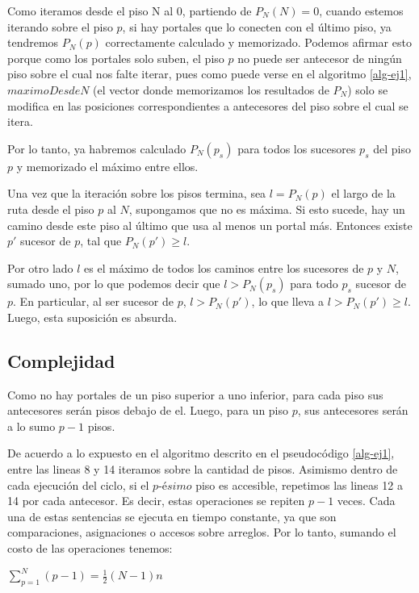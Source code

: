 Como iteramos desde el piso N al 0, partiendo de $P_N(N) = 0$, cuando estemos iterando sobre el piso $p$, si hay portales que lo conecten con el último piso, ya tendremos $P_N(p)$ correctamente calculado y memorizado.
Podemos afirmar esto porque como los portales solo suben, el piso $p$ no puede ser antecesor de ningún piso sobre el cual nos falte iterar, pues como puede verse en el algoritmo \ref{alg-ej1}, $maximoDesdeN$ (el vector donde memorizamos los resultados de $P_N$) solo se modifica en las posiciones correspondientes a antecesores del piso sobre el cual se itera.

Por lo tanto, ya habremos calculado $P_N(p_s)$ para todos los sucesores $p_s$ del piso $p$ y memorizado el máximo entre ellos. 

Una vez que la iteración sobre los pisos termina, sea $l = P_N(p)$ el largo de la ruta desde el piso $p$ al $N$, supongamos que no es máxima.
Si esto sucede, hay un camino desde este piso al último que usa al menos un portal más.  Entonces existe $p'$ sucesor de $p$, tal que $P_N(p') \geq l$. 

Por otro lado $l$ es el máximo de todos los caminos entre los sucesores de $p$ y $N$, sumado uno, por lo que podemos decir que $l > P_N(p_s)$ para todo $p_s$ sucesor de $p$.
En particular, al ser sucesor de $p$, $l > P_N(p')$, lo que lleva a $l > P_N(p') \geq l$. Luego, esta suposición es absurda.

\subsection{Complejidad}

Como no hay portales de un piso superior a uno inferior, para cada piso sus antecesores serán pisos debajo de el. Luego, para un piso $p$, sus antecesores serán a lo sumo $p-1$ pisos.

De acuerdo a lo expuesto en el algoritmo descrito en el pseudocódigo \ref{alg-ej1}, entre las lineas 8 y 14 iteramos sobre la cantidad de pisos.
Asimismo dentro de cada ejecución del ciclo, si el $\textit{p-ésimo}$ piso es accesible, repetimos las lineas 12 a 14 por cada antecesor. Es decir, estas operaciones se repiten $p-1$ veces. Cada una de estas sentencias se ejecuta en tiempo constante, ya que son comparaciones, asignaciones o accesos sobre arreglos. Por lo tanto, sumando el costo de las operaciones tenemos:
\begin{center}
$\sum_{p=1}^{N}(p-1) = \frac{1}{2}(N-1)n$
\end{center}

